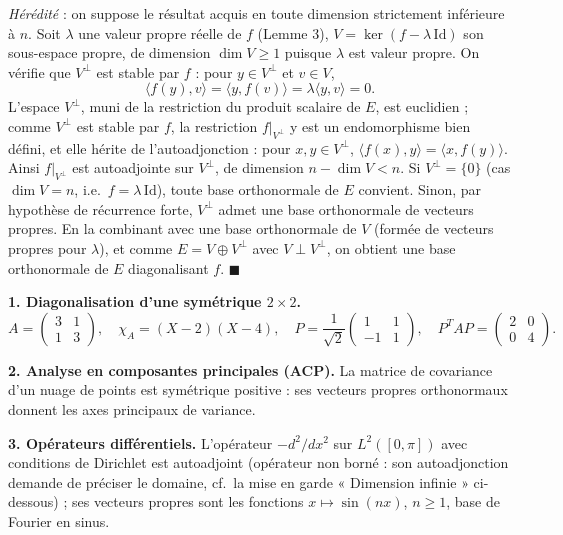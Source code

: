 \begin{mdframed}[style=proofbar]
  \textit{Hérédité} : on suppose le résultat acquis en toute dimension
  strictement inférieure à $n$. Soit $\lambda$ une valeur propre réelle de $f$ (Lemme 3),
  $V = \ker(f-\lambda\,\mathrm{Id})$ son sous-espace propre, de dimension
  $\dim V \geq 1$ puisque $\lambda$ est valeur propre. On vérifie que
  $V^\perp$ est stable par $f$ : pour $y\in V^\perp$ et $v\in V$,
  \[
    \langle f(y),v\rangle = \langle y,f(v)\rangle = \lambda\langle y,v\rangle = 0.
  \]
  L'espace $V^\perp$, muni de la restriction du produit scalaire de $E$, est
  euclidien ; comme $V^\perp$ est stable par $f$, la restriction $f|_{V^\perp}$
  y est un endomorphisme bien défini, et elle hérite de l'autoadjonction :
  pour $x,y\in V^\perp$, $\langle f(x),y\rangle = \langle x,f(y)\rangle$. Ainsi
  $f|_{V^\perp}$ est autoadjointe sur $V^\perp$, de dimension
  $n - \dim V < n$. Si $V^\perp = \{0\}$ (cas $\dim V = n$, i.e.\
  $f = \lambda\,\mathrm{Id}$), toute base orthonormale de $E$ convient.
  Sinon, par hypothèse de récurrence forte, $V^\perp$ admet une base
  orthonormale de vecteurs propres. En la combinant avec une base orthonormale
  de $V$ (formée de vecteurs propres pour $\lambda$), et comme $E = V\oplus V^\perp$
  avec $V\perp V^\perp$, on obtient une base orthonormale de $E$ diagonalisant $f$.
  \hfill$\blacksquare$
\end{mdframed}

\decsep{}



\begin{mdframed}[style=exbar]
  \textbf{1. Diagonalisation d'une symétrique $2\times 2$.}
  \[
    A = \begin{pmatrix}3 & 1\\1 & 3\end{pmatrix},\quad
    \chi_A = (X-2)(X-4),\quad
    P = \frac{1}{\sqrt{2}}\begin{pmatrix}1&1\\-1&1\end{pmatrix},\quad
    P^TAP = \begin{pmatrix}2&0\\0&4\end{pmatrix}.
  \]

  \smallskip\noindent
  \textbf{2. Analyse en composantes principales (ACP).}
  La matrice de covariance d'un nuage de points est symétrique positive :
  ses vecteurs propres orthonormaux donnent les axes principaux de variance.

  \smallskip\noindent
  \textbf{3. Opérateurs différentiels.}
  L'opérateur $-d^2/dx^2$ sur $L^2([0,\pi])$ avec conditions de Dirichlet
  est autoadjoint (opérateur non borné : son autoadjonction demande de
  préciser le domaine, cf.\ la mise en garde « Dimension infinie »
  ci-dessous) ; ses vecteurs propres sont les fonctions $x\mapsto\sin(nx)$,
  $n\geq 1$, base de Fourier en sinus.
\end{mdframed}

